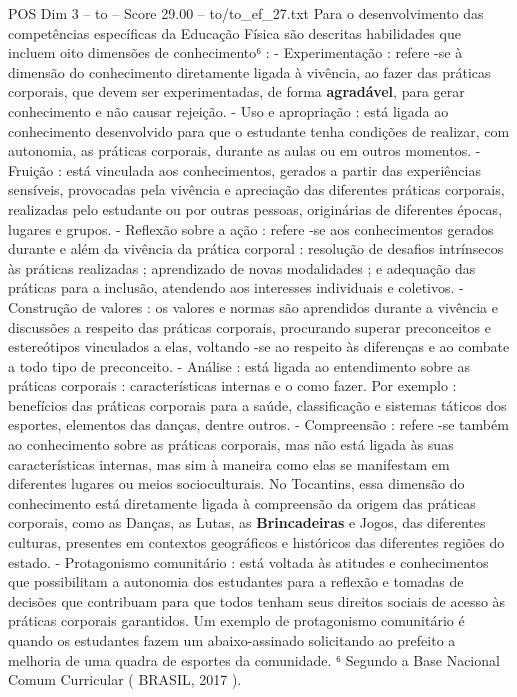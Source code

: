 \begin{textsample}{POS Dim 3 – to – Score 29.00 – to/to\_ef\_27.txt}
Para o desenvolvimento das competências específicas da Educação Física são descritas habilidades que incluem oito dimensões de conhecimento⁶ : - Experimentação : refere -se à dimensão do conhecimento diretamente ligada à vivência, ao fazer das práticas corporais, que devem ser experimentadas, de forma \textbf{agradável}, para gerar conhecimento e não causar rejeição. - Uso e apropriação : está ligada ao conhecimento desenvolvido para que o estudante tenha condições de realizar, com autonomia, as práticas corporais, durante as aulas ou em outros momentos. - Fruição : está vinculada aos conhecimentos, gerados a partir das experiências sensíveis, provocadas pela vivência e apreciação das diferentes práticas corporais, realizadas pelo estudante ou por outras pessoas, originárias de diferentes épocas, lugares e grupos. - Reflexão sobre a ação : refere -se aos conhecimentos gerados durante e além da vivência da prática corporal : resolução de desafios intrínsecos às práticas realizadas ; aprendizado de novas modalidades ; e adequação das práticas para a inclusão, atendendo aos interesses individuais e coletivos. - Construção de valores : os valores e normas são aprendidos durante a vivência e discussões a respeito das práticas corporais, procurando superar preconceitos e estereótipos vinculados a elas, voltando -se ao respeito às diferenças e ao combate a todo tipo de preconceito. - Análise : está ligada ao entendimento sobre as práticas corporais : características internas e o como fazer.
Por exemplo : benefícios das práticas corporais para a saúde, classificação e sistemas táticos dos esportes, elementos das danças, dentre outros. - Compreensão : refere -se também ao conhecimento sobre as práticas corporais, mas não está ligada às suas características internas, mas sim à maneira como elas se manifestam em diferentes lugares ou meios socioculturais.
No Tocantins, essa dimensão do conhecimento está diretamente ligada à compreensão da origem das práticas corporais, como as Danças, as Lutas, as \textbf{Brincadeiras} e Jogos, das diferentes culturas, presentes em contextos geográficos e históricos das diferentes regiões do estado. - Protagonismo comunitário : está voltada às atitudes e conhecimentos que possibilitam a autonomia dos estudantes para a reflexão e tomadas de decisões que contribuam para que todos tenham seus direitos sociais de acesso às práticas corporais garantidos.
Um exemplo de protagonismo comunitário é quando os estudantes fazem um abaixo-assinado solicitando ao prefeito a melhoria de uma quadra de esportes da comunidade. ⁶ Segundo a Base Nacional Comum Curricular ( BRASIL, 2017 ).

\end{textsample}
